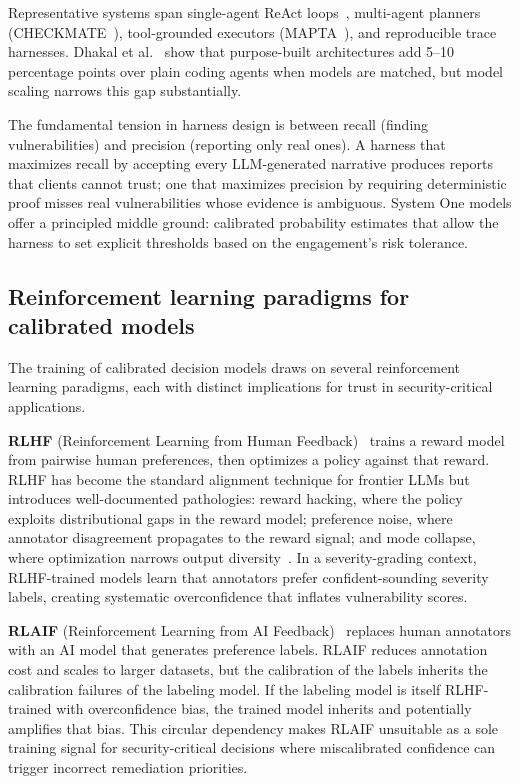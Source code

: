 \documentclass[conference]{IEEEtran}
\begin{document}
Representative systems span single-agent ReAct loops~\cite{fang2024oneday}, multi-agent planners (CHECKMATE~\cite{wang2025checkmate}), tool-grounded executors (MAPTA~\cite{david2025mapta}), and reproducible trace harnesses. Dhakal et al.~\cite{dhakal2026baselines} show that purpose-built architectures add 5--10 percentage points over plain coding agents when models are matched, but model scaling narrows this gap substantially.

The fundamental tension in harness design is between recall (finding vulnerabilities) and precision (reporting only real ones). A harness that maximizes recall by accepting every LLM-generated narrative produces reports that clients cannot trust; one that maximizes precision by requiring deterministic proof misses real vulnerabilities whose evidence is ambiguous. System One models offer a principled middle ground: calibrated probability estimates that allow the harness to set explicit thresholds based on the engagement's risk tolerance.

\subsection{Reinforcement learning paradigms for calibrated models}\label{sec:rl_background}

The training of calibrated decision models draws on several reinforcement learning paradigms, each with distinct implications for trust in security-critical applications.

\textbf{RLHF} (Reinforcement Learning from Human Feedback)~\cite{ouyang2022training} trains a reward model from pairwise human preferences, then optimizes a policy against that reward. RLHF has become the standard alignment technique for frontier LLMs but introduces well-documented pathologies: reward hacking, where the policy exploits distributional gaps in the reward model; preference noise, where annotator disagreement propagates to the reward signal; and mode collapse, where optimization narrows output diversity~\cite{casper2023open}. In a severity-grading context, RLHF-trained models learn that annotators prefer confident-sounding severity labels, creating systematic overconfidence that inflates vulnerability scores.

\textbf{RLAIF} (Reinforcement Learning from AI Feedback)~\cite{bai2022constitutional} replaces human annotators with an AI model that generates preference labels. RLAIF reduces annotation cost and scales to larger datasets, but the calibration of the labels inherits the calibration failures of the labeling model. If the labeling model is itself RLHF-trained with overconfidence bias, the trained model inherits and potentially amplifies that bias. This circular dependency makes RLAIF unsuitable as a sole training signal for security-critical decisions where miscalibrated confidence can trigger incorrect remediation priorities.
\end{document}
